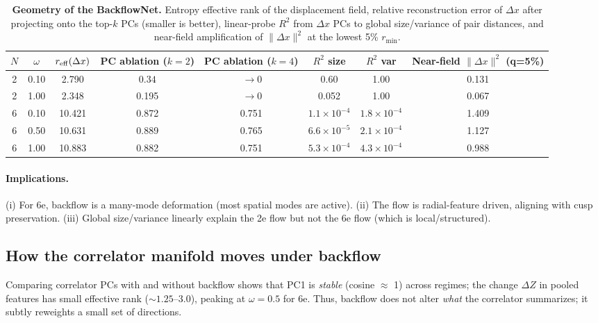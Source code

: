 \begin{table*}[t] \centering \small \setlength{\tabcolsep}{6.0pt} \begin{tabular}{cccccccc} \toprule $N$ & $\omega$ & $r_{\rm eff}(\Delta x)$ & PC ablation ($k{=}2$) & PC ablation ($k{=}4$) & $R^2$ size & $R^2$ var & Near-field $\|\Delta x\|^2$ (q=5\%) \\ \midrule 2 & 0.10 & 2.790 & $0.34$ & $\,\to 0$ & 0.60 & 1.00 & 0.131 \\ 2 & 1.00 & 2.348 & 0.195 & $\,\to 0$ & 0.052 & 1.00 & 0.067 \\ 6 & 0.10 & 10.421 & 0.872 & 0.751 & $1.1{\times}10^{-4}$ & $1.8{\times}10^{-4}$ & 1.409 \\ 6 & 0.50 & 10.631 & 0.889 & 0.765 & $6.6{\times}10^{-5}$ & $2.1{\times}10^{-4}$ & 1.127 \\ 6 & 1.00 & 10.883 & 0.882 & 0.751 & $5.3{\times}10^{-4}$ & $4.3{\times}10^{-4}$ & 0.988 \\ \bottomrule \end{tabular} \caption{\textbf{Geometry of the BackflowNet.} Entropy effective rank of the displacement field, relative reconstruction error of $\Delta x$ after projecting onto the top-$k$ PCs (smaller is better), linear-probe $R^2$ from $\Delta x$ PCs to global size/variance of pair distances, and near-field amplification of $\|\Delta x\|^2$ at the lowest 5\% $r_{\min}$.} \label{tab:bf-geometry} \end{table*}

\paragraph{Implications.}
(i) For 6e, backflow is a many-mode deformation (most spatial modes are active).
(ii) The flow is radial-feature driven, aligning with cusp preservation.
(iii) Global size/variance linearly explain the 2e flow but not the 6e flow (which is local/structured).

\subsection{How the correlator manifold moves under backflow}
Comparing correlator PCs with and without backflow shows that PC1 is \emph{stable} (cosine $\approx$ 1) across regimes;
the change $\Delta Z$ in pooled features has small effective rank ($\sim 1.25$–$3.0$), peaking at $\omega{=}0.5$ for 6e.
Thus, backflow does not alter \emph{what} the correlator summarizes; it subtly reweights a small set of directions.


